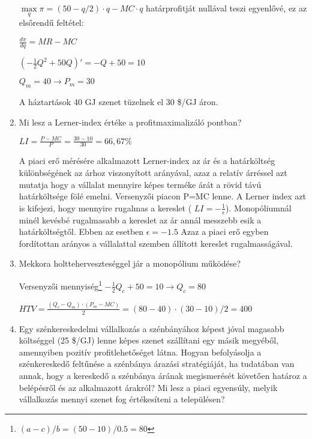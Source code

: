 \documentclass[10pt,a4paper]{article}
\begin{document}
\begin{enumerate}[label=(\alph*)]
$\max\limits_{q} \pi  = (50-q/2) \cdot q - MC \cdot q $ 
határprofitját nullával teszi egyenlővé, ez az elsőrendű feltétel:

$\displaystyle\frac{d\pi}{dq} = MR-MC$

$(-\displaystyle\frac{1}{2}Q^2 + 50Q)' = -Q +50 = 10$

$Q_m = 40 \rightarrow P_m = 30 $

A háztartások 40 GJ szenet tüzelnek el 30 \$/GJ áron.




\item Mi lesz a Lerner-index értéke a profitmaximalizáló pontban?

$LI = \displaystyle\frac{P-MC}{P} =\frac{30-10}{30} = 66,67 \%$

A piaci erő mérésére alkalmazott Lerner-index az ár és a határköltség különbségének az árhoz viszonyított arányával, azaz a relatív árréssel azt mutatja hogy a vállalat mennyire képes terméke árát a rövid távú határköltsége fölé emelni. Versenyzői piacon P=MC lenne. A Lerner index azt is kifejezi, hogy mennyire rugalmas a kereslet ( $LI = -\displaystyle\frac{1}{\epsilon}$). Monopóliumnál minél kevésbé rugalmasabb a kereslet az ár annál messzebb esik a határköltségtől. Ebben az esetben $\epsilon = -1.5$ Azaz a piaci erő egyben fordítottan arányos a vállalattal szemben állított kereslet rugalmasságával.

\item Mekkora holtteherveszteséggel jár a monopólium működése?

Versenyzői mennyiség\footnote{$(a-c)/b = (50-10)/0.5 = 80$}
$-\displaystyle\frac{1}{2}Q_c +50 = 10 \rightarrow Q_c = 80$



$HTV = \displaystyle\frac{(Q_c - Q_m) \cdot (P_m-MC)}{2} = (80-40) \cdot (30-10) /2 = 400 $


\item Egy szénkereskedelmi vállalkozás a szénbányához képest jóval magasabb költséggel (25 \$/GJ) lenne képes szenet szállítani egy másik megyéből, amennyiben pozitív profitlehetőséget látna. Hogyan befolyásolja a szénkereskedő feltűnése a szénbánya árazási stratégiáját, ha tudatában van annak, hogy a kereskedő a szénbánya árának megismerését követően határoz a belépésről és az alkalmazott árakról? Mi lesz a piaci egyensúly, melyik vállalkozás mennyi szenet fog értékesíteni a településen?

\end{enumerate}
\end{document}
